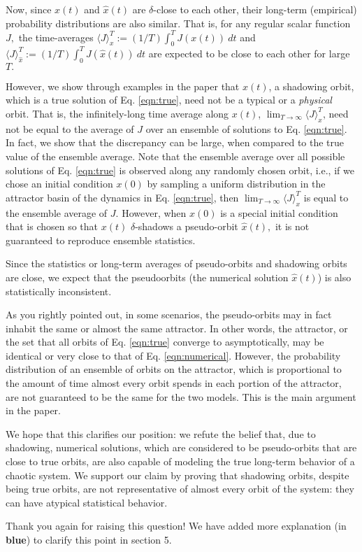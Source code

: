 \documentclass[11pt]{article}
\newcommand{\reviewerTwo}[1]{{\color{azure}\textbf{#1}}}
\begin{document}
Now, since $x(t)$ and $\hat{x}(t)$ are $\delta$-close to each other, their long-term (empirical) probability distributions are also similar. That is, for any regular scalar function $J,$ the time-averages $\langle J\rangle_x^T := (1/T)\int_0^T J(x(t))\: dt$ and 
$\langle J\rangle_{\hat{x}}^T := (1/T) \int_0^T J(\hat{x}(t)) \: dt$ are expected to be close to each other for large $T.$ 

However, we show through examples in the paper that $x(t)$, a shadowing orbit, which is a true solution of Eq. \ref{eqn:true}, need not be a typical or a {\em physical} orbit. That is, the infinitely-long time average along $x(t)$, $\lim_{T\to\infty} \langle J\rangle_x^T$, need not be equal to the average of $J$ over an ensemble of solutions to Eq. \ref{eqn:true}. In fact, we show that the discrepancy can be large, when compared to the true value of the ensemble average. Note that the ensemble average over all possible solutions of Eq. \ref{eqn:true} is observed along any randomly chosen orbit, i.e., if we chose an initial condition $x(0)$ by sampling a uniform distribution in the attractor basin of the dynamics in Eq. \ref{eqn:true}, then $\lim_{T\to\infty}\langle J\rangle_x^T$ is equal to the ensemble average of $J.$ However, when $x(0)$ is a special initial condition that is chosen so that $x(t)$ $\delta$-shadows a pseudo-orbit $\hat{x}(t),$ it is not guaranteed to reproduce ensemble statistics.

Since the statistics or long-term averages of pseudo-orbits and shadowing orbits are close, we expect that the pseudoorbits (the numerical solution $\hat{x}(t)$) is also statistically inconsistent. 

As you rightly pointed out, in some scenarios, the pseudo-orbits may in fact inhabit the same or almost the same attractor. In other words, the attractor, or the set that all orbits of Eq. \ref{eqn:true} converge to asymptotically, may be identical or very close to that of Eq. \ref{eqn:numerical}. However, the probability distribution of an ensemble of orbits on the attractor, which is proportional to the amount of time almost every orbit spends in each portion of the attractor, are not guaranteed to be the same for the two models. This is the main argument in the paper.

We hope that this clarifies our position: we refute the belief that, due to shadowing, numerical solutions, which are considered to be pseudo-orbits that are close to true orbits, are also capable of modeling the true long-term behavior of a chaotic system. We support our claim by proving that shadowing orbits, despite being true orbits, are not representative of almost every orbit of the system: they can have atypical statistical behavior. 

Thank you again for raising this question! We have added more explanation (in \reviewerTwo{blue}) to clarify this point in section 5.
\end{document}

